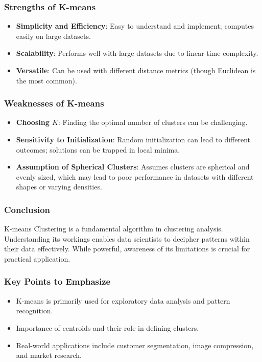 \documentclass[aspectratio=169]{beamer}
\begin{document}
\begin{frame}[fragile]
    \frametitle{Strengths of K-means}
    \begin{itemize}
        \item \textbf{Simplicity and Efficiency}: Easy to understand and implement; computes easily on large datasets.
        \item \textbf{Scalability}: Performs well with large datasets due to linear time complexity.
        \item \textbf{Versatile}: Can be used with different distance metrics (though Euclidean is the most common).
    \end{itemize}
\end{frame}

\begin{frame}[fragile]
    \frametitle{Weaknesses of K-means}
    \begin{itemize}
        \item \textbf{Choosing \( K \)}: Finding the optimal number of clusters can be challenging.
        \item \textbf{Sensitivity to Initialization}: Random initialization can lead to different outcomes; solutions can be trapped in local minima.
        \item \textbf{Assumption of Spherical Clusters}: Assumes clusters are spherical and evenly sized, which may lead to poor performance in datasets with different shapes or varying densities.
    \end{itemize}
\end{frame}

\begin{frame}[fragile]
    \frametitle{Conclusion}
    K-means Clustering is a fundamental algorithm in clustering analysis. Understanding its workings enables data scientists to decipher patterns within their data effectively. While powerful, awareness of its limitations is crucial for practical application.
\end{frame}

\begin{frame}[fragile]
    \frametitle{Key Points to Emphasize}
    \begin{itemize}
        \item K-means is primarily used for exploratory data analysis and pattern recognition.
        \item Importance of centroids and their role in defining clusters.
        \item Real-world applications include customer segmentation, image compression, and market research.
    \end{itemize}
\end{frame}
\end{document}
